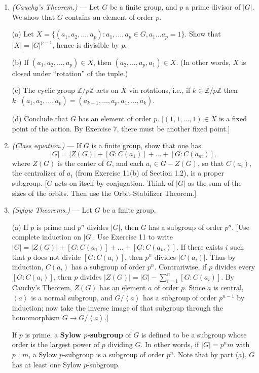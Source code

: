 \documentclass[leqno]{book}
\begin{document}
\begin{enumerate}
\item\emph{(Cauchy's Theorem.)} \---- Let $G$ be a finite group, and $p$ a prime divisor of $|G|$.  We show that $G$ contains an element of order $p$.

(a) Let $X=\{(a_1,a_2,\dots,a_p):a_1,\dots,a_p\in G,a_1\dots a_p=1\}$.  Show that $|X|=|G|^{p-1}$, hence is divisible by $p$.

(b) If $(a_1,a_2,\dots,a_p)\in X$, then $(a_2,\dots,a_p,a_1)\in X$.  (In other words, $X$ is closed under ``rotation'' of the tuple.)

(c) The cyclic group $\mathbb Z/p\mathbb Z$ acts on $X$ via rotations, i.e., if $k\in\mathbb Z/p\mathbb Z$ then $k\cdot(a_1,a_2,\dots,a_p)=(a_{k+1},\dots,a_p,a_1,\dots,a_k)$.

(d) Conclude that $G$ has an element of order $p$.  [$(1,1,\dots,1)\in X$ is a fixed point of the action.  By Exercise 7, there must be another fixed point.]

\item\emph{(Class equation.)} \---- If $G$ is a finite group, show that one has
$$|G|=|Z(G)|+[G:C(a_1)]+\dots+[G:C(a_m)],$$
where $Z(G)$ is the center of $G$, and each $a_i\in G-Z(G)$, so that $C(a_i)$, the centralizer of $a_i$ (from Exercise 11(b) of Section 1.2), is a proper subgroup.
[$G$ acts on itself by conjugation.  Think of $|G|$ as the sum of the sizes of the orbits.  Then use the Orbit-Stabilizer Theorem.]

\item\emph{(Sylow Theorems.)} \---- Let $G$ be a finite group.

(a) If $p$ is prime and $p^n$ divides $|G|$, then $G$ has a subgroup of order $p^n$.  [Use complete induction on $|G|$.  Use Exercise 11 to write $|G|=|Z(G)|+[G:C(a_1)]+\dots+[G:C(a_m)]$.  If there exists $i$ such that $p$ does not divide $[G:C(a_i)]$, then $p^n$ divides $|C(a_i)|$.  Thus by induction, $C(a_i)$ has a subgroup of order $p^n$.  Contrariwise, if $p$ divides every $[G:C(a_i)]$, then $p$ divides $|Z(G)|=|G|-\sum_{i=1}^n[G:C(a_i)]$.  By Cauchy's Theorem, $Z(G)$ has an element $a$ of order $p$.  Since $a$ is central, $\left<a\right>$ is a normal subgroup, and $G/\left<a\right>$ has a subgroup of order $p^{n-1}$ by induction; now take the inverse image of that subgroup through the homomorphism $G\to G/\left<a\right>$.]

If $p$ is prime, a \textbf{Sylow $p$-subgroup} of $G$ is defined to be a subgroup whose order is the largest power of $p$ dividing $G$.  In other words, if $|G|=p^nm$ with $p\nmid m$, a Sylow $p$-subgroup is a subgroup of order $p^n$.  Note that by part (a), $G$ has at least one Sylow $p$-subgroup.


\end{enumerate}
\end{document}
